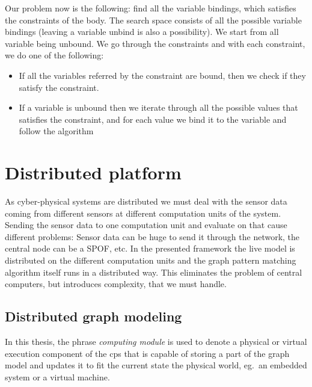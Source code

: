 Our problem now is the following: find all the variable bindings, which satisfies the constraints of the body.
The search space consists of all the possible variable bindings (leaving a variable unbind is also a possibility). 
We start from all variable being unbound. 
We go through the constraints and with each constraint, we do one of the following:
\begin{itemize}
	\item If all the variables referred by the constraint are bound, then we check if they satisfy the constraint.
	\item If a variable is unbound then we iterate through all the possible values that satisfies the constraint, and for each value we bind it to the variable and follow the algorithm
\end{itemize}






\section{Distributed platform}


As cyber-physical systems are distributed we must deal with the sensor data coming from different sensors at different computation units of the system. 
Sending the sensor data to one computation unit and evaluate on that cause different problems: 
Sensor data can be huge to send it through the network, the central node can be a SPOF, etc. 
In the presented framework the live model is distributed on the different computation units and the graph pattern matching algorithm itself runs in a distributed way. 
This eliminates the problem of central computers, but introduces complexity, that we must handle.

\subsection{Distributed graph modeling}

In this thesis, the phrase \emph{computing module} is used to denote a physical or virtual execution component of the cps that is capable of storing a part of the graph model and updates it to fit the current state the physical world, eg.\ an embedded system or a virtual machine.

